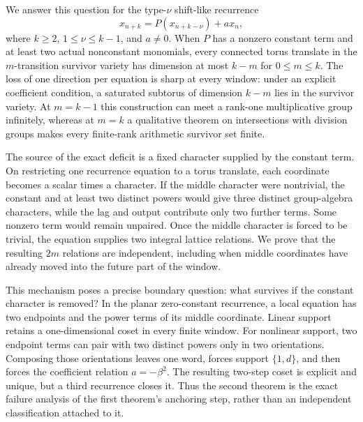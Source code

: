 \documentclass[11pt]{article}
\theoremstyle{definition}
\theoremstyle{remark}
\begin{document}
We answer this question for the type-$\nu$ shift-like recurrence
\begin{equation}
x_{n+k}=P(x_{n+k-\nu})+a x_n,
\label{eq:intro-recurrence}
\end{equation}
where $k\geq2$, $1\leq\nu\leq k-1$, and $a\neq0$.  When $P$ has a nonzero constant term and at least two actual nonconstant monomials, every connected torus translate in the $m$-transition survivor variety has dimension at most $k-m$ for $0\leq m\leq k$.  The loss of one direction per equation is sharp at every window: under an explicit coefficient condition, a saturated subtorus of dimension $k-m$ lies in the survivor variety.  At $m=k-1$ this construction can meet a rank-one multiplicative group infinitely, whereas at $m=k$ a qualitative theorem on intersections with division groups makes every finite-rank arithmetic survivor set finite.

The source of the exact deficit is a fixed character supplied by the constant term.  On restricting one recurrence equation to a torus translate, each coordinate becomes a scalar times a character.  If the middle character were nontrivial, the constant and at least two distinct powers would give three distinct group-algebra characters, while the lag and output contribute only two further terms.  Some nonzero term would remain unpaired.  Once the middle character is forced to be trivial, the equation supplies two integral lattice relations.  We prove that the resulting $2m$ relations are independent, including when middle coordinates have already moved into the future part of the window.

This mechanism poses a precise boundary question: what survives if the constant character is removed?  In the planar zero-constant recurrence, a local equation has two endpoints and the power terms of its middle coordinate.  Linear support retains a one-dimensional coset in every finite window.  For nonlinear support, two endpoint terms can pair with two distinct powers only in two orientations.  Composing those orientations leaves one word, forces support $\{1,d\}$, and then forces the coefficient relation $a=-\beta^2$.  The resulting two-step coset is explicit and unique, but a third recurrence closes it.  Thus the second theorem is the exact failure analysis of the first theorem's anchoring step, rather than an independent classification attached to it.
\end{document}
